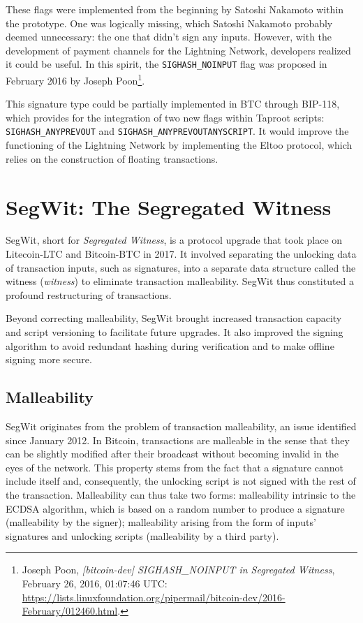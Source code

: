 \documentclass[
  a5paper,
  smalldemyvopaper,10pt,twoside,onecolumn,openright,extrafontsizes,hidelinks]{memoir}
\begin{document}
These flags were implemented from the beginning by Satoshi Nakamoto
within the prototype. One was logically missing, which Satoshi Nakamoto
probably deemed unnecessary: the one that didn't sign any inputs.
However, with the development of payment channels for the Lightning
Network, developers realized it could be useful. In this spirit, the
\texttt{SIGHASH\_NOINPUT} flag was proposed in February 2016 by Joseph
Poon\footnote{Joseph Poon, \emph{{[}bitcoin-dev{]} SIGHASH\_NOINPUT in
  Segregated Witness}, February 26, 2016, 01:07:46 UTC:
  \url{https://lists.linuxfoundation.org/pipermail/bitcoin-dev/2016-February/012460.html}.}.

This signature type could be partially implemented in BTC through
BIP-118, which provides for the integration of two new flags within
Taproot scripts: \texttt{SIGHASH\_ANYPREVOUT} and
\texttt{SIGHASH\_ANYPREVOUTANYSCRIPT}. It would improve the functioning
of the Lightning Network by implementing the Eltoo protocol, which
relies on the construction of floating transactions.

\section*{SegWit: The Segregated
Witness}\label{segwit-the-segregated-witness}


SegWit, short for \emph{Segregated Witness}, is a protocol upgrade that
took place on Litecoin-LTC and Bitcoin-BTC in 2017. It involved
separating the unlocking data of transaction inputs, such as signatures,
into a separate data structure called the witness (\emph{witness}) to
eliminate transaction malleability. SegWit thus constituted a profound
restructuring of transactions.

Beyond correcting malleability, SegWit brought increased transaction
capacity and script versioning to facilitate future upgrades. It also
improved the signing algorithm to avoid redundant hashing during
verification and to make offline signing more secure.

\subsection{Malleability}\label{malleability}

SegWit originates from the problem of transaction malleability, an issue
identified since January 2012. In Bitcoin, transactions are malleable in
the sense that they can be slightly modified after their broadcast
without becoming invalid in the eyes of the network. This property stems
from the fact that a signature cannot include itself and, consequently,
the unlocking script is not signed with the rest of the transaction.
Malleability can thus take two forms: malleability intrinsic to the
ECDSA algorithm, which is based on a random number to produce a
signature (malleability by the signer); malleability arising from the
form of inputs' signatures and unlocking scripts (malleability by a
third party).
\end{document}
